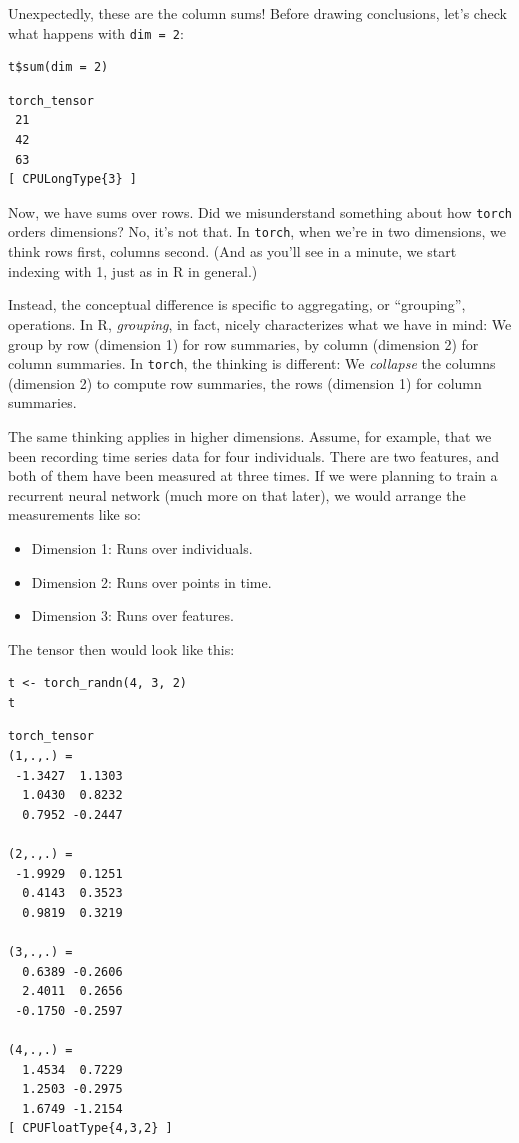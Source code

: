 \documentclass[
  letterpaper,
]{krantz}
\begin{document}
Unexpectedly, these are the column sums! Before drawing conclusions,
let's check what happens with \texttt{dim\ =\ 2}:

\begin{verbatim}
t$sum(dim = 2)
\end{verbatim}

\begin{verbatim}
torch_tensor
 21
 42
 63
[ CPULongType{3} ]
\end{verbatim}

Now, we have sums over rows. Did we misunderstand something about how
\texttt{torch} orders dimensions? No, it's not that. In \texttt{torch},
when we're in two dimensions, we think rows first, columns second. (And
as you'll see in a minute, we start indexing with 1, just as in R in
general.)

Instead, the conceptual difference is specific to aggregating, or
``grouping'', operations. In R, \emph{grouping}, in fact, nicely
characterizes what we have in mind: We group by row (dimension 1) for
row summaries, by column (dimension 2) for column summaries. In
\texttt{torch}, the thinking is different: We \emph{collapse} the
columns (dimension 2) to compute row summaries, the rows (dimension 1)
for column summaries.

The same thinking applies in higher dimensions. Assume, for example,
that we been recording time series data for four individuals. There are
two features, and both of them have been measured at three times. If we
were planning to train a recurrent neural network (much more on that
later), we would arrange the measurements like so:

\begin{itemize}
\item
  Dimension 1: Runs over individuals.
\item
  Dimension 2: Runs over points in time.
\item
  Dimension 3: Runs over features.
\end{itemize}

The tensor then would look like this:

\begin{verbatim}
t <- torch_randn(4, 3, 2)
t
\end{verbatim}

\begin{verbatim}
torch_tensor
(1,.,.) = 
 -1.3427  1.1303
  1.0430  0.8232
  0.7952 -0.2447

(2,.,.) = 
 -1.9929  0.1251
  0.4143  0.3523
  0.9819  0.3219

(3,.,.) = 
  0.6389 -0.2606
  2.4011  0.2656
 -0.1750 -0.2597

(4,.,.) = 
  1.4534  0.7229
  1.2503 -0.2975
  1.6749 -1.2154
[ CPUFloatType{4,3,2} ]
\end{verbatim}
\end{document}
